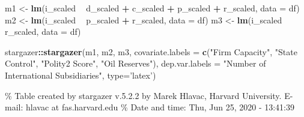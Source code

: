 \documentclass[11pt,]{book}
\newenvironment{Shaded}{\begin{snugshade}}{\end{snugshade}}
\newcommand{\DataTypeTok}[1]{\textcolor[rgb]{0.13,0.29,0.53}{#1}}
\newcommand{\KeywordTok}[1]{\textcolor[rgb]{0.13,0.29,0.53}{\textbf{#1}}}
\newcommand{\NormalTok}[1]{#1}
\newcommand{\OperatorTok}[1]{\textcolor[rgb]{0.81,0.36,0.00}{\textbf{#1}}}
\newcommand{\StringTok}[1]{\textcolor[rgb]{0.31,0.60,0.02}{#1}}
\begin{document}
\begin{Shaded}
\begin{Highlighting}[]
\NormalTok{m1 <-}\StringTok{ }\KeywordTok{lm}\NormalTok{(i_scaled }\OperatorTok{~}\StringTok{ }\NormalTok{d_scaled }\OperatorTok{+}\StringTok{ }\NormalTok{c_scaled }\OperatorTok{+}\StringTok{ }\NormalTok{p_scaled }\OperatorTok{+}\StringTok{ }\NormalTok{r_scaled, }\DataTypeTok{data =}\NormalTok{ df)}
\NormalTok{m2 <-}\StringTok{ }\KeywordTok{lm}\NormalTok{(i_scaled }\OperatorTok{~}\StringTok{ }\NormalTok{p_scaled }\OperatorTok{+}\StringTok{ }\NormalTok{r_scaled, }\DataTypeTok{data =}\NormalTok{ df)}
\NormalTok{m3 <-}\StringTok{ }\KeywordTok{lm}\NormalTok{(i_scaled }\OperatorTok{~}\StringTok{ }\NormalTok{r_scaled, }\DataTypeTok{data =}\NormalTok{ df)}
\end{Highlighting}
\end{Shaded}

\begin{Shaded}
\begin{Highlighting}[]
\NormalTok{stargazer}\OperatorTok{::}\KeywordTok{stargazer}\NormalTok{(m1, m2, m3, }
          \DataTypeTok{covariate.labels =} \KeywordTok{c}\NormalTok{(}\StringTok{"Firm Capacity"}\NormalTok{, }
                               \StringTok{"State Control"}\NormalTok{, }
                               \StringTok{"Polity2 Score"}\NormalTok{, }
                               \StringTok{"Oil Reserves"}\NormalTok{),}
          \DataTypeTok{dep.var.labels   =} \StringTok{"Number of International Subsidiaries"}\NormalTok{,}
          \DataTypeTok{type=}\StringTok{'latex'}\NormalTok{)}
\end{Highlighting}
\end{Shaded}

\% Table created by stargazer v.5.2.2 by Marek Hlavac, Harvard University. E-mail: hlavac at fas.harvard.edu
\% Date and time: Thu, Jun 25, 2020 - 13:41:39
\end{document}
